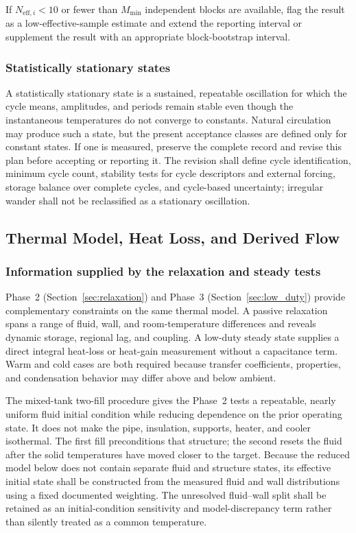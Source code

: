 \documentclass[11pt]{article}
\begin{document}
If $N_{\mathrm{eff},i}<10$ or fewer than $M_{\min}$ independent blocks are available, flag the result as a low-effective-sample estimate and extend the reporting interval or supplement the result with an appropriate block-bootstrap interval.

\subsubsection{Statistically stationary states}
\label{sec:stationary_state}

A statistically stationary state is a sustained, repeatable oscillation for which the cycle means, amplitudes, and periods remain stable even though the instantaneous temperatures do not converge to constants. Natural circulation may produce such a state, but the present acceptance classes are defined only for constant states. If one is measured, preserve the complete record and revise this plan before accepting or reporting it. The revision shall define cycle identification, minimum cycle count, stability tests for cycle descriptors and external forcing, storage balance over complete cycles, and cycle-based uncertainty; irregular wander shall not be reclassified as a stationary oscillation.

\subsection{Thermal Model, Heat Loss, and Derived Flow}

\subsubsection{Information supplied by the relaxation and steady tests}
\label{sec:relaxation_basis}

Phase~2 (Section~\ref{sec:relaxation}) and Phase~3 (Section~\ref{sec:low_duty}) provide complementary constraints on the same thermal model. A passive relaxation spans a range of fluid, wall, and room-temperature differences and reveals dynamic storage, regional lag, and coupling. A low-duty steady state supplies a direct integral heat-loss or heat-gain measurement without a capacitance term. Warm and cold cases are both required because transfer coefficients, properties, and condensation behavior may differ above and below ambient.

The mixed-tank two-fill procedure gives the Phase~2 tests a repeatable, nearly uniform fluid initial condition while reducing dependence on the prior operating state. It does not make the pipe, insulation, supports, heater, and cooler isothermal. The first fill preconditions that structure; the second resets the fluid after the solid temperatures have moved closer to the target. Because the reduced model below does not contain separate fluid and structure states, its effective initial state shall be constructed from the measured fluid and wall distributions using a fixed documented weighting. The unresolved fluid--wall split shall be retained as an initial-condition sensitivity and model-discrepancy term rather than silently treated as a common temperature.
\end{document}
